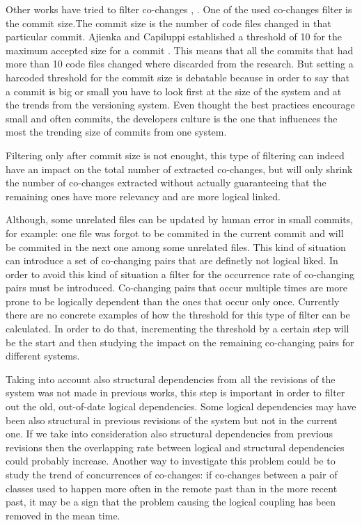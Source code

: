 \documentclass[12pt]{mitthesis}
\begin{document}
Other works have tried to filter co-changes \cite{Oliva:2011:ISL:2067853.2068086}, \cite{DBLP:journals/jss/AjienkaC17}. One of the used co-changes filter is the commit size.The commit size is the number of code files changed in that particular commit. 
Ajienka and Capiluppi established a threshold of 10 for the maximum accepted size for a commit \cite{DBLP:journals/jss/AjienkaC17}. This means that all the commits that had more than 10 code files changed where discarded from the research. But setting a harcoded threshold for the commit size is debatable because in order to say that a commit is big or small you have to look first at the size of the system and at the trends from the versioning system. Even thought the best practices encourage small and often commits, the developers culture is the one that influences the most the trending size of commits from one system.

Filtering only after commit size is not enought, this type of filtering can indeed have an impact on the total number of extracted co-changes, but will only shrink the number of co-changes extracted without actually guaranteeing that the remaining ones have more relevancy and are more logical linked.

Although, some unrelated files can be updated by human error in small commits, for example: one file was forgot to be commited in the current commit and will be commited in the next one among some unrelated files. This kind of situation can introduce a set of co-changing pairs that are definetly not logical liked. In order to avoid this kind of situation a filter for the occurrence rate of co-changing pairs must be introduced. Co-changing pairs that occur multiple times are more prone to be logically dependent than the ones that occur only once. Currently there are no concrete examples of how the threshold for this type of filter can be calculated. In order to do that, incrementing the threshold by a certain step will be the start and then studying the impact on the remaining co-changing pairs for different systems. 

Taking into account also structural dependencies from all the revisions of the system was not made in previous works, this step is important in order to filter out the old, out-of-date logical dependencies. Some logical dependencies may have been also structural in previous revisions of the system but not in the current one. If we take into consideration also structural dependencies from previous revisions then the overlapping rate between logical and structural dependencies could probably increase. Another way to investigate this problem could be to study the trend of concurrences of co-changes: if co-changes between a pair of classes used to happen more often in the remote past than in the more recent past, it may be a sign that the problem causing the logical coupling has been removed in the mean time. 
\end{document}
